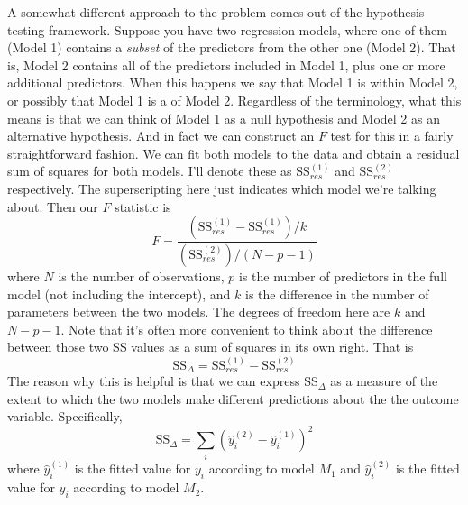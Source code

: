A somewhat different approach to the problem comes out of the hypothesis testing framework. Suppose you have two regression models, where one of them (Model 1) contains a {\it subset} of the predictors from the other one (Model 2). That is, Model 2 contains all of the predictors included in Model 1, plus one or more additional predictors. When this happens we say that Model 1 is  within Model 2, or possibly that Model 1 is a  of Model 2. Regardless of the terminology, what this means is that we can think of Model 1 as a null hypothesis and Model 2 as an alternative hypothesis. And in fact we can construct an $F$ test for this in a fairly straightforward fashion. We can fit both models to the data and obtain a residual sum of squares for both models. I'll denote these as SS$_{res}^{(1)}$ and SS$_{res}^{(2)}$ respectively. The superscripting here just indicates which model we're talking about.  Then our $F$ statistic is
$$
F = \frac{(\mbox{SS}_{res}^{(1)} - \mbox{SS}_{res}^{(1)})/k}{(\mbox{SS}_{res}^{(2)})/(N-p-1)}
$$
where $N$ is the number of observations, $p$ is the number of predictors in the full model (not including the intercept), and $k$ is the difference in the number of parameters between the two models. The degrees of freedom here are $k$ and $N-p-1$. Note that it's often more convenient to think about the difference between those two SS values as a sum of squares in its own right. That is 
$$
\mbox{SS}_\Delta = \mbox{SS}_{res}^{(1)} - \mbox{SS}_{res}^{(2)}
$$
The reason why this is helpful is that we can express $\mbox{SS}_\Delta$ as a measure of the extent to which the two models make different predictions about the the outcome variable. Specifically,
$$
\mbox{SS}_\Delta  = \sum_{i} \left( \hat{y}_i^{(2)} - \hat{y}_i^{(1)} \right)^2
$$
where $\hat{y}_i^{(1)}$ is the fitted value for $y_i$ according to model $M_1$ and  $\hat{y}_i^{(2)}$ is the fitted value for $y_i$ according to model $M_2$. 

